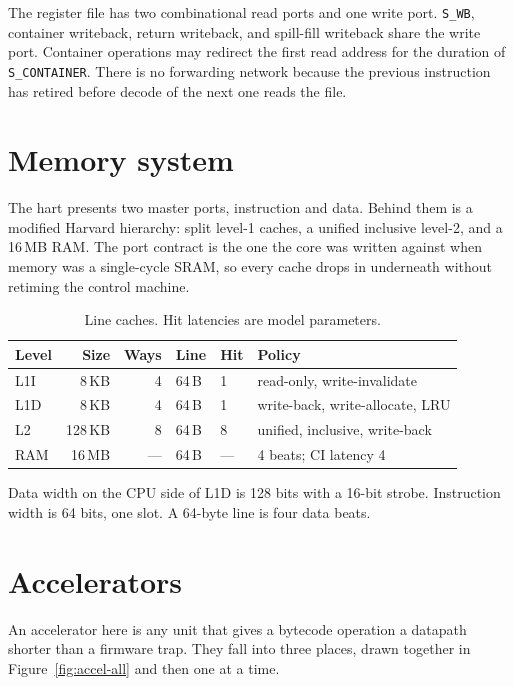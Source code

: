 \documentclass[11pt,a4paper]{article}
\begin{document}
The register file has two combinational read ports and one write port.
\texttt{S\_WB}, container writeback, return writeback, and spill-fill
writeback share the write port.
Container operations may redirect the first read address for the duration
of \texttt{S\_CONTAINER}.
There is no forwarding network because the previous instruction has retired
before decode of the next one reads the file.

\section{Memory system}
\label{sec:mem}

The hart presents two master ports, instruction and data.
Behind them is a modified Harvard hierarchy: split level-1 caches, a unified
inclusive level-2, and a 16\,MB RAM.
The port contract is the one the core was written against when memory was a
single-cycle SRAM, so every cache drops in underneath without retiming the
control machine.



\begin{table}[htbp]
\centering
\caption{Line caches. Hit latencies are model parameters.}
\label{tab:caches}
\small
\begin{tabular}{@{}lrrllp{}@{}}
\toprule
Level & Size & Ways & Line & Hit & Policy \\
\midrule
L1I & 8\,KB & 4 & 64\,B & 1 & read-only, write-invalidate \\
L1D & 8\,KB & 4 & 64\,B & 1 & write-back, write-allocate, LRU \\
L2 & 128\,KB & 8 & 64\,B & 8 & unified, inclusive, write-back \\
RAM & 16\,MB & --- & 64\,B & --- & 4 beats; CI latency 4 \\
\bottomrule
\end{tabular}
\end{table}

Data width on the CPU side of L1D is 128 bits with a 16-bit strobe.
Instruction width is 64 bits, one slot.
A 64-byte line is four data beats.

\section{Accelerators}
\label{sec:accel}

An accelerator here is any unit that gives a bytecode operation a datapath
shorter than a firmware trap.
They fall into three places, drawn together in Figure~\ref{fig:accel-all}
and then one at a time.
\end{document}
